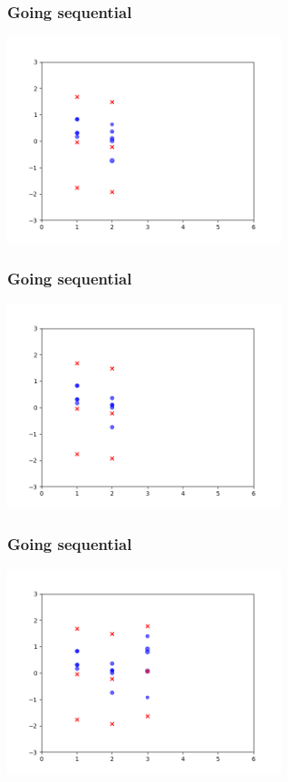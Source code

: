 \documentclass{beamer}
\begin{document}
\begin{frame}[fragile]
\frametitle{Going sequential}

\begin{center}
\includegraphics[width=80mm]{pfilt_anim_3.png}
\end{center}

\end{frame}
\begin{frame}[fragile]
\frametitle{Going sequential}

\begin{center}
\includegraphics[width=80mm]{pfilt_anim_4.png}
\end{center}

\end{frame}
\begin{frame}[fragile]
\frametitle{Going sequential}

\begin{center}
\includegraphics[width=80mm]{pfilt_anim_5.png}
\end{center}

\end{frame}
\end{document}
